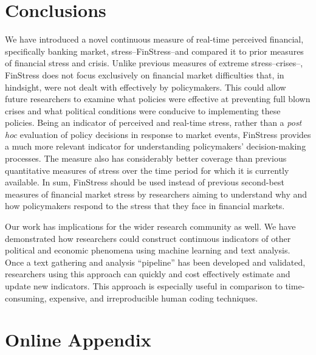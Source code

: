 \documentclass[]{article}
\begin{document}
\section{Conclusions}\label{conclusions}

We have introduced a novel continuous measure of real-time perceived financial, specifically banking market, stress--FinStress--and compared it to prior measures of financial stress and crisis. Unlike previous measures of extreme stress--crises--, FinStress does not focus exclusively on financial market difficulties that, in hindsight, were not dealt with effectively by policymakers. This could allow future researchers to examine what policies were effective at preventing full blown crises and what political conditions were conducive to implementing these policies. Being an indicator of perceived and real-time stress, rather than a \emph{post hoc} evaluation of policy decisions in response to market events, FinStress provides a much more relevant indicator for understanding policymakers' decision-making processes. The measure also has considerably better coverage than previous quantitative measures of stress over the time period for which it is currently available. In sum, FinStress should be used instead of previous second-best measures of financial market stress by researchers aiming to understand why and how policymakers respond to the stress that they face in financial markets.

Our work has implications for the wider research community as well. We have demonstrated how researchers could construct continuous indicators of other political and economic phenomena using machine learning and text analysis. Once a text gathering and analysis ``pipeline'' \citep{Leek2015} has been developed and validated, researchers using this approach can quickly and cost effectively estimate and update new indicators. This approach is especially useful in comparison to time-consuming, expensive, and irreproducible human coding techniques.




\pagebreak
\renewcommand{\thepage}{A-\arabic{page}}\setcounter{page}{1}
\renewcommand{\thesection}{Appendix \arabic{section}}\setcounter{section}{0}
\renewcommand{\thetable}{A-\arabic{table}}\setcounter{table}{0}
\renewcommand{\thefigure}{A-\arabic{figure}}\setcounter{figure}{0}
\clearpage

\section*{Online Appendix}
\end{document}
